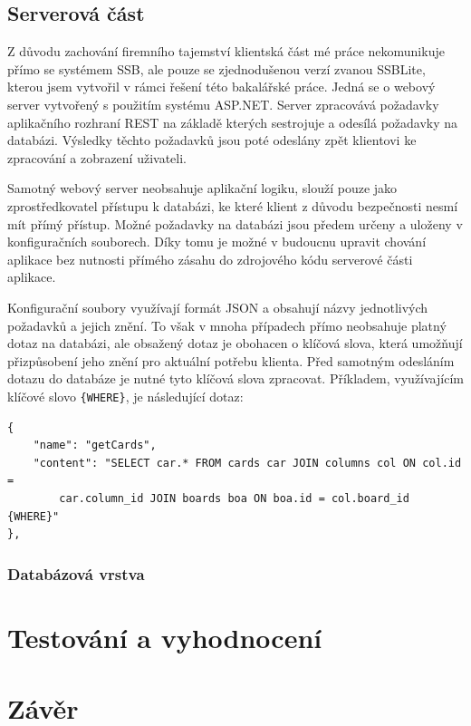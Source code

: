 \section{Serverová část}

Z důvodu zachování firemního tajemství klientská část mé práce nekomunikuje přímo se systémem SSB, ale pouze se zjednodušenou verzí zvanou SSBLite, kterou jsem vytvořil v rámci řešení této bakalářské práce. Jedná se o webový server vytvořený s použitím systému ASP.NET. Server zpracovává požadavky aplikačního rozhraní REST na základě kterých sestrojuje a odesílá požadavky na databázi. Výsledky těchto požadavků jsou poté odeslány zpět klientovi ke zpracování a zobrazení uživateli.

Samotný webový server neobsahuje aplikační logiku, slouží pouze jako zprostředkovatel přístupu k databázi, ke které klient z důvodu bezpečnosti nesmí mít přímý přístup. Možné požadavky na databázi jsou předem určeny a uloženy v konfiguračních souborech. Díky tomu je možné v budoucnu upravit chování aplikace bez nutnosti přímého zásahu do zdrojového kódu serverové části aplikace. 

Konfigurační soubory využívají formát JSON a obsahují názvy jednotlivých požadavků a jejich znění. To však v mnoha případech přímo neobsahuje platný dotaz na databázi, ale obsažený dotaz je obohacen o klíčová slova, která umožňují přizpůsobení jeho znění pro aktuální potřebu klienta. Před samotným odesláním dotazu do databáze je nutné tyto klíčová slova zpracovat. Příkladem, využívajícím klíčové slovo \texttt{\{WHERE\}}, je následující dotaz:
\begin{verbatim}
{
    "name": "getCards",
    "content": "SELECT car.* FROM cards car JOIN columns col ON col.id = 
        car.column_id JOIN boards boa ON boa.id = col.board_id {WHERE}"
},
\end{verbatim}

\subsection{Databázová vrstva}

\chapter{Testování a vyhodnocení}


\chapter{Závěr}